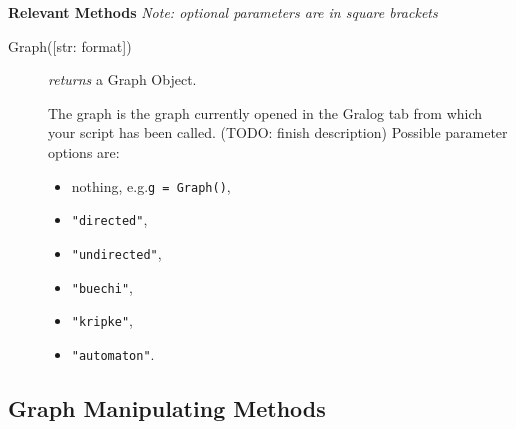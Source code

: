 \documentclass{article}
\newlength\q
\begin{document}
\textbf{{\large Relevant Methods}}
\textit{Note: optional parameters are in square brackets}


\begin{description}
\item[Graph({[str: format]})] \emph{returns} a Graph Object.


                                               The graph is the graph
currently opened in the Gralog tab from which your script has been
called. (TODO: finish description) Possible parameter options are:
\begin{itemize}
\item nothing, e.g.\@ \texttt{g = Graph()},
\item \texttt{"directed"},
\item \texttt{"{}undirected"},
\item \texttt{"buechi"},
\item \texttt{"kripke"},
\item \texttt{"{}automaton"}.
\end{itemize}
\end{description}

\subsection{Graph Manipulating Methods}
\end{document}

